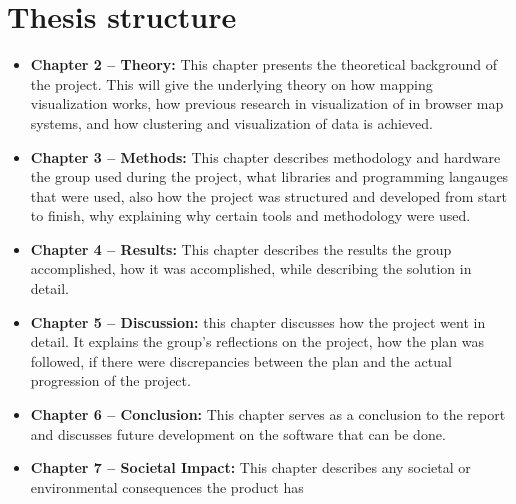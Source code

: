 \section{Thesis structure}
\begin{itemize}

\item \textbf{Chapter 2 – Theory:} This chapter presents the theoretical background of the project. This will give the underlying theory on how mapping visualization works, how previous research in visualization of in browser map systems, and how clustering and visualization of data is achieved. \\


\item \textbf{Chapter 3 – Methods:} This chapter describes methodology and hardware the group used during the project, what libraries and programming langauges that were used, also how the project was structured and developed from start to finish, why explaining why certain tools and methodology were used.\\


\item \textbf{Chapter 4 – Results:} This chapter describes the results the group accomplished, how it was accomplished, while describing the solution in detail.\\ 


\item \textbf{Chapter 5 – Discussion:} this chapter discusses how the project went in detail. It explains the group's reflections on the project, how the plan was followed, if there were discrepancies between the plan and the actual progression of the project.\\

\item \textbf{Chapter 6 – Conclusion:} This chapter serves as a conclusion to the report and discusses future development on the software that can be done.

\item \textbf{Chapter 7 – Societal Impact:} This chapter describes any societal or environmental consequences the product has

\end{itemize}